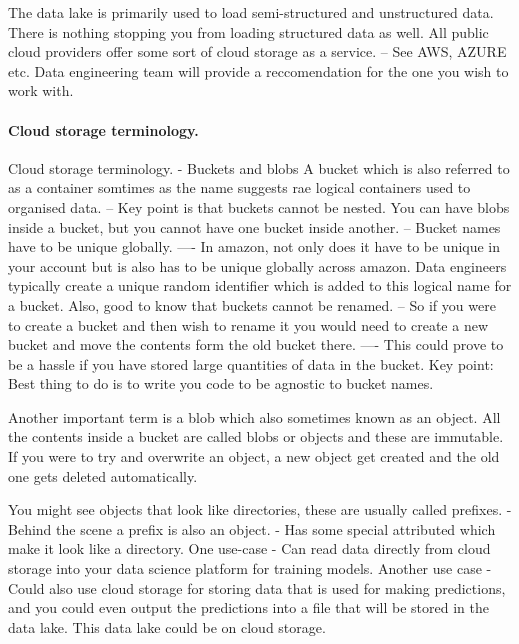\documentclass[a4paper, 11pt]{article}
\begin{document}
    The data lake is primarily used to load semi-structured and unstructured data.
    There is nothing stopping you from loading structured data as well.
    All public cloud providers offer some sort of cloud storage as a service.
    -- See AWS, AZURE etc. Data engineering team will provide a reccomendation for the one you wish to work with.

   \paragraph{Cloud storage terminology.}
    Cloud storage terminology.
    - Buckets and blobs
    A bucket which is also referred to as a container somtimes as the name suggests rae logical containers used to organised data.
    -- Key point is that buckets cannot be nested.
    You can have blobs inside a bucket, but you cannot have one bucket inside another.
    -- Bucket names have to be unique globally.
    ---- In amazon, not only does it have to be unique in your account but is also has to be unique globally across amazon.
    Data engineers typically create a unique random identifier which is added to this logical name for a bucket.
    Also, good to know that buckets cannot be renamed.
    -- So if you were to create a bucket and then wish to rename it you would need to create a new bucket and move the contents form the old bucket there.
    ---- This could prove to be a hassle if you have stored large quantities of data in the bucket.
    Key point: Best thing to do is to write you code to be agnostic to bucket names.

    Another important term is a blob which also sometimes known as an object.
    All the contents inside a bucket are called blobs or objects and these are immutable.
    If you were to try and overwrite an object, a new object get created and the old one gets deleted automatically.

    You might see objects that look like directories, these are usually called prefixes.
    - Behind the scene a prefix is also an object.
    - Has some special attributed which make it look like a directory.
    One use-case
    - Can read data directly from cloud storage into your data science platform for training models.
    Another use case
    - Could also use cloud storage for storing data that is used for making predictions, and you could even output the predictions into a file that will be stored in the data lake.
    This data lake could be on cloud storage.
\end{document}
